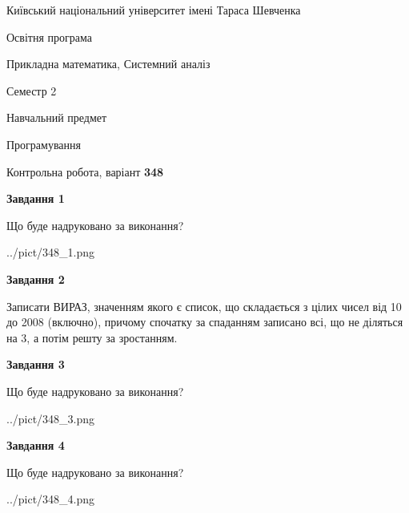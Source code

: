 \documentclass[12pt, ukrainian]{article}
\begin{document}
{{\begin {small}\par
{ \center  Київський національний університет імені Тараса Шевченка \par}
{\parbox {5 cm}{Освітня програма \hfill}{\parbox {8 cm}{Прикладна математика, Системний аналіз \hfill}}\parbox {5 cm}{\hfill Семестр 2}}\par
{\parbox {5 cm} {Навчальний предмет \hfill}\parbox {7 cm}{Програмування \hfill}\parbox {6cm}{\hfill}\par}\vspace{-7pt} \end{small}}{\center Контрольна робота, варіант  \No \textbf
{ 348 }\par}}
{
\begin {large}
{\begin {center}\textbf{Завдання 1}\end {center}}\par
Що буде надруковано за виконання?\par\par
\begin{center}
	{../pict/348_1.png}
\end{center}
\newpage

{\begin {center}\textbf{Завдання 2}\end {center}}\par

Записати ВИРАЗ, значенням якого є список, що складається з цілих чисел від 10 до 2008 (включно), причому спочатку за спаданням записано всі, що не діляться на 3, а потім решту за зростанням.\par
\newpage

{\begin {center}\textbf{Завдання 3}\end {center}}\par
Що буде надруковано за виконання?\par
\begin{center}
	{../pict/348_3.png}
\end{center}
\newpage

{\begin {center}\textbf{Завдання 4}\end {center}}\par
Що буде надруковано за виконання?\par
\begin{center}
	{../pict/348_4.png}
\end{center}
\newpage


\end{large}}
\end{document}
